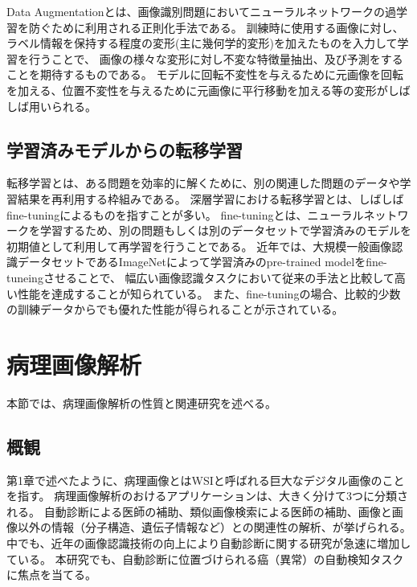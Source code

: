 Data Augmentationとは、画像識別問題においてニューラルネットワークの過学習を防ぐために利用される正則化手法である。
訓練時に使用する画像に対し、ラベル情報を保持する程度の変形(主に幾何学的変形)を加えたものを入力して学習を行うことで、
画像の様々な変形に対し不変な特徴量抽出、及び予測をすることを期待するものである。
モデルに回転不変性を与えるために元画像を回転を加える、位置不変性を与えるために元画像に平行移動を加える等の変形がしばしば用いられる。

\subsection{学習済みモデルからの転移学習}
\label{sec:transfer}
転移学習とは、ある問題を効率的に解くために、別の関連した問題のデータや学習結果を再利用する枠組みである。
深層学習における転移学習とは、しばしばfine-tuningによるものを指すことが多い。
fine-tuningとは、ニューラルネットワークを学習するため、別の問題もしくは別のデータセットで学習済みのモデルを初期値として利用して再学習を行うことである。
近年では、大規模一般画像認識データセットであるImageNetによって学習済みのpre-trained modelをfine-tuneingさせることで、
幅広い画像認識タスクにおいて従来の手法と比較して高い性能を達成することが知られている。
また、fine-tuningの場合、比較的少数の訓練データからでも優れた性能が得られることが示されている。

\section{病理画像解析}
本節では、病理画像解析の性質と関連研究を述べる。

\subsection{概観}
第1章で述べたように、病理画像とはWSIと呼ばれる巨大なデジタル画像のことを指す。
病理画像解析のおけるアプリケーションは、大きく分けて3つに分類される\cite{komuraishikawa}。
自動診断による医師の補助、類似画像検索による医師の補助、画像と画像以外の情報（分子構造、遺伝子情報など）との関連性の解析、が挙げられる。
中でも、近年の画像認識技術の向上により自動診断に関する研究が急速に増加している。
本研究でも、自動診断に位置づけられる癌（異常）の自動検知タスクに焦点を当てる。

